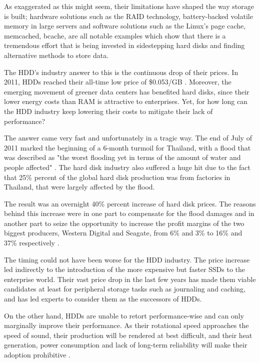 As exaggerated as this might seem, their limitations have shaped the way 
storage is built; hardware solutions such as the RAID technology, 
battery-backed volatile memory in large servers and software solutions such as 
the Linux's page cache, memcached, bcache, are all notable examples which show 
that there is a tremendous effort that is being invested in sidestepping hard 
disks and finding alternative methods to store data.

The HDD's industry answer to this is the continuous drop of their prices.  In 
2011, HDDs reached their all-time low price of \$0.053/GB \cite{hdd-price}.  
Moreover, the emerging movement of greener data centers has benefited hard 
disks, since their lower energy costs than RAM is attractive to enterprises.  
Yet, for how long can the HDD industry keep lowering their costs to mitigate 
their lack of performance?

The answer came very fast and unfortunately in a tragic way. The end of July of 
2011 marked the beginning of a 6-month turmoil for Thailand, with a flood that 
was described as "the worst flooding yet in terms of the amount of water and 
people affected" \cite{flood}. The hard disk industry also suffered a huge hit 
due to the fact that 25\% percent of the global hard disk production was from 
factories in Thailand, that were largely affected by the flood.

The result was an overnight 40\% percent increase of hard disk prices. The 
reasons behind this increase were in one part to compensate for the flood 
damages and in another part to seize the opportunity to increase the profit 
margins of the two biggest producers, Western Digital and Seagate, from 6\% and 
3\% to 16\% and 37\% respectively \cite{rosenthal12-unesco}.

The timing could not have been worse for the HDD industry. The price increase 
led indirectly to the introduction of the more expensive but faster SSDs to the 
enterprise world. Their vast price drop \cite{ssd-price,ssddrop} in the last 
few years has made them viable candidates at least for peripheral storage tasks 
such as journaling and caching, and has led experts to consider them as the 
successors of HDDs.

On the other hand, HDDs are unable to retort performance-wise and can only 
marginally improve their performance.  As their rotational speed approaches the 
speed of sound, their production will be rendered at best difficult, and their 
heat generation, power consumption and lack of long-term reliability will make 
their adoption prohibitive \cite{hddtrends,speed-of-sound}.

